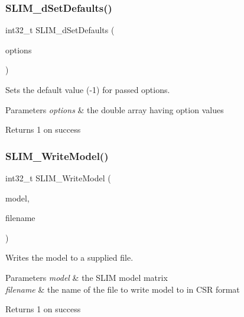 \subsubsection{\texorpdfstring{SLIM\_dSetDefaults()}{SLIM\_dSetDefaults()}}
{\footnotesize\ttfamily int32\+\_\+t S\+L\+I\+M\+\_\+d\+Set\+Defaults (\begin{DoxyParamCaption}\item[{double $\ast$}]{options }\end{DoxyParamCaption})}



Sets the default value (-\/1) for passed options. 


\begin{DoxyParams}{Parameters}
{\em options} & the double array having option values \\
\hline
\end{DoxyParams}
\begin{DoxyReturn}{Returns}
1 on success 
\end{DoxyReturn}
\mbox{\label{group__slimapi_ga4a73297a1dcf82ed110a1bb349120f2a}} 
\subsubsection{\texorpdfstring{SLIM\_WriteModel()}{SLIM\_WriteModel()}}
{\footnotesize\ttfamily int32\+\_\+t S\+L\+I\+M\+\_\+\+Write\+Model (\begin{DoxyParamCaption}\item[{slim\+\_\+t $\ast$}]{model,  }\item[{char $\ast$}]{filename }\end{DoxyParamCaption})}



Writes the model to a supplied file. 


\begin{DoxyParams}{Parameters}
{\em model} & the S\+L\+IM model matrix \\
\hline
{\em filename} & the name of the file to write model to in C\+SR format \\
\hline
\end{DoxyParams}
\begin{DoxyReturn}{Returns}
1 on success 
\end{DoxyReturn}
\mbox{\label{group__slimapi_ga6ee60da1ee298e093723e9dfd9f21f1c}} 
